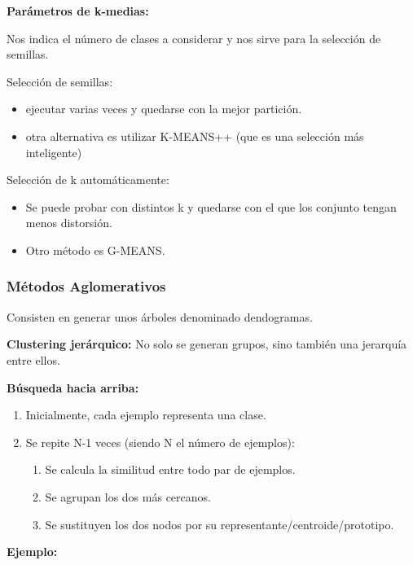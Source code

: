 \documentclass[12pt]{report} %
\begin{document}
\textbf{Parámetros de k-medias:}

Nos indica el número de clases a considerar y nos sirve para la selección de semillas.

Selección de semillas:
\begin{itemize}
  \item ejecutar varias veces y quedarse con la mejor partición.
  \item otra alternativa es utilizar K-MEANS++ (que es una selección más inteligente)
\end{itemize}

Selección de k automáticamente:
\begin{itemize}
  \item Se puede probar con distintos k y quedarse con el que los conjunto tengan menos distorsión.
  \item Otro método es G-MEANS.
\end{itemize}

\subsubsection{Métodos Aglomerativos}

Consisten en generar unos árboles denominado dendogramas.

\textbf{Clustering jerárquico:} No solo se generan grupos, sino también una jerarquía entre ellos.

\textbf{Búsqueda hacia arriba:} 
\begin{enumerate}
  \item Inicialmente, cada ejemplo representa una clase.
  \item Se repite N-1 veces (siendo N el número de ejemplos):
  \begin{enumerate}
    \item Se calcula la similitud entre todo par de ejemplos.
    \item Se agrupan los dos más cercanos.
    \item Se sustituyen los dos nodos por su representante/centroide/prototipo.
  \end{enumerate}
\end{enumerate}

\textbf{Ejemplo:}
\end{document}
